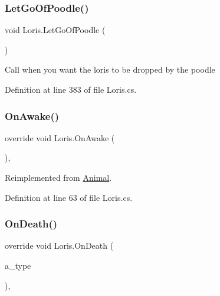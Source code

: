 \subsubsection{\texorpdfstring{Let\+Go\+Of\+Poodle()}{LetGoOfPoodle()}}
{\footnotesize\ttfamily void Loris.\+Let\+Go\+Of\+Poodle (\begin{DoxyParamCaption}{ }\end{DoxyParamCaption})}



Call when you want the loris to be dropped by the poodle 



Definition at line 383 of file Loris.\+cs.

\mbox{\label{class_loris_abf831310421343c4685d7fb6844c522b}} 
\subsubsection{\texorpdfstring{On\+Awake()}{OnAwake()}}
{\footnotesize\ttfamily override void Loris.\+On\+Awake (\begin{DoxyParamCaption}{ }\end{DoxyParamCaption})\hspace{0.3cm}{\ttfamily [protected]}, {\ttfamily [virtual]}}



Reimplemented from \mbox{\hyperlink{class_animal_a8ed14f752254b7033466bbd0c846a972}{Animal}}.



Definition at line 63 of file Loris.\+cs.

\mbox{\label{class_loris_a9edf28bf01dbd817175b366f471a4dda}} 
\subsubsection{\texorpdfstring{On\+Death()}{OnDeath()}}
{\footnotesize\ttfamily override void Loris.\+On\+Death (\begin{DoxyParamCaption}\item[{\mbox{\hyperlink{_animal_8cs_aa09ea87b75a706096f010aef7b9b1826}{D\+E\+A\+T\+H\+\_\+\+T\+Y\+PE}}}]{a\+\_\+type }\end{DoxyParamCaption})\hspace{0.3cm}{\ttfamily [protected]}, {\ttfamily [virtual]}}



